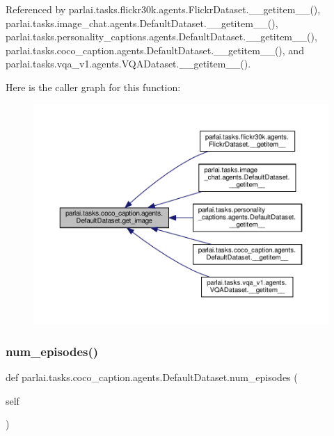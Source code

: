 Referenced by parlai.\+tasks.\+flickr30k.\+agents.\+Flickr\+Dataset.\+\_\+\+\_\+getitem\+\_\+\+\_\+(), parlai.\+tasks.\+image\+\_\+chat.\+agents.\+Default\+Dataset.\+\_\+\+\_\+getitem\+\_\+\+\_\+(), parlai.\+tasks.\+personality\+\_\+captions.\+agents.\+Default\+Dataset.\+\_\+\+\_\+getitem\+\_\+\+\_\+(), parlai.\+tasks.\+coco\+\_\+caption.\+agents.\+Default\+Dataset.\+\_\+\+\_\+getitem\+\_\+\+\_\+(), and parlai.\+tasks.\+vqa\+\_\+v1.\+agents.\+V\+Q\+A\+Dataset.\+\_\+\+\_\+getitem\+\_\+\+\_\+().

Here is the caller graph for this function\+:
\nopagebreak
\begin{figure}[H]
\begin{center}
\leavevmode
\includegraphics[width=350pt]{classparlai_1_1tasks_1_1coco__caption_1_1agents_1_1DefaultDataset_ae769cbe2c9a42fc0ecc817a2baeffb77_icgraph}
\end{center}
\end{figure}
\mbox{\label{classparlai_1_1tasks_1_1coco__caption_1_1agents_1_1DefaultDataset_a436d5bfe6f79ae3d94f1935e56bf4f84}} 
\subsubsection{\texorpdfstring{num\+\_\+episodes()}{num\_episodes()}}
{\footnotesize\ttfamily def parlai.\+tasks.\+coco\+\_\+caption.\+agents.\+Default\+Dataset.\+num\+\_\+episodes (\begin{DoxyParamCaption}\item[{}]{self }\end{DoxyParamCaption})}



